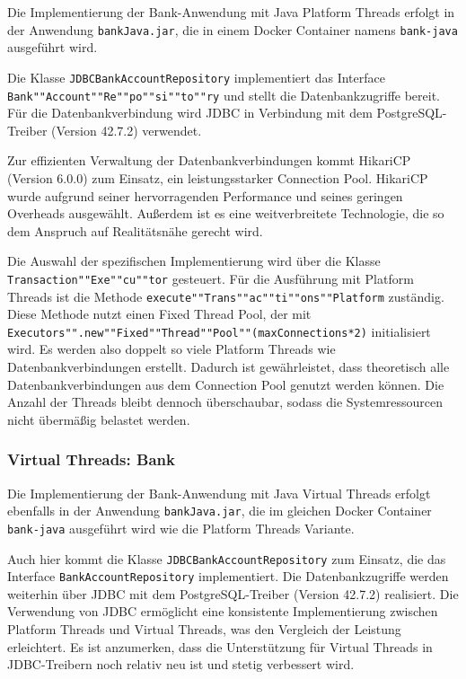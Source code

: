 \documentclass[fontsize=12pt,paper=a4,twoside=semi,parskip=half-,headsepline,headinclude]{scrreprt}
\begin{document}
Die Implementierung der Bank-Anwendung mit Java Platform Threads erfolgt in der Anwendung \texttt{bankJava.jar}, die in einem Docker Container namens \texttt{bank-java} ausgeführt wird.

Die Klasse \texttt{JDBCBankAccountRepository} implementiert das Interface \texttt{Bank""Account""Re""po""si""to""ry} und stellt die Datenbankzugriffe bereit. Für die Datenbankverbindung wird JDBC in Verbindung mit dem PostgreSQL-Treiber (Version 42.7.2) verwendet. 

Zur effizienten Verwaltung der Datenbankverbindungen kommt HikariCP (Version 6.0.0) zum Einsatz, ein leistungsstarker Connection Pool. HikariCP wurde aufgrund seiner hervorragenden Performance und seines geringen Overheads ausgewählt. Außerdem ist es eine weitverbreitete Technologie, die so dem Anspruch auf Realitätsnähe gerecht wird.

Die Auswahl der spezifischen Implementierung wird über die Klasse \texttt{Transaction""Exe""cu""tor} gesteuert. Für die Ausführung mit Platform Threads ist die Methode \texttt{execute""Trans""ac""ti""ons""Platform} zuständig. Diese Methode nutzt einen Fixed Thread Pool, der mit \texttt{Executors"".new""Fixed""Thread""Pool""(maxConnections*2)} initialisiert wird. Es werden also doppelt so viele Platform Threads wie Datenbankverbindungen erstellt. Dadurch ist gewährleistet, dass theoretisch alle Datenbankverbindungen aus dem Connection Pool genutzt werden können. Die Anzahl der Threads bleibt dennoch überschaubar, sodass die Systemressourcen nicht übermäßig belastet werden.


\subsubsection{Virtual Threads: Bank}

Die Implementierung der Bank-Anwendung mit Java Virtual Threads erfolgt ebenfalls in der Anwendung \texttt{bankJava.jar}, die im gleichen Docker Container \texttt{bank-java} ausgeführt wird wie die Platform Threads Variante.

Auch hier kommt die Klasse \texttt{JDBCBankAccountRepository} zum Einsatz, die das Interface \texttt{BankAccountRepository} implementiert. Die Datenbankzugriffe werden weiterhin über JDBC mit dem PostgreSQL-Treiber (Version 42.7.2) realisiert. Die Verwendung von JDBC ermöglicht eine konsistente Implementierung zwischen Platform Threads und Virtual Threads, was den Vergleich der Leistung erleichtert. Es ist anzumerken, dass die Unterstützung für Virtual Threads in JDBC-Treibern noch relativ neu ist und stetig verbessert wird.
\end{document}
